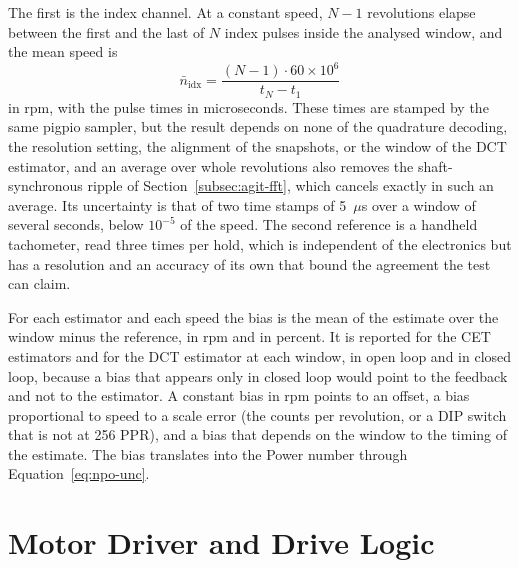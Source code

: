 The first is the index channel. At a constant speed, $N - 1$ revolutions elapse between the first and the last of $N$ index pulses inside the analysed window, and the mean speed is
\begin{equation}
    \bar{n}_{\mathrm{idx}} = \frac{(N-1)\cdot 60\times10^{6}}{t_N - t_1}
    \label{eq:idx-mean}
\end{equation}
in rpm, with the pulse times in microseconds. These times are stamped by the same pigpio sampler, but the result depends on none of the quadrature decoding, the resolution setting, the alignment of the snapshots, or the window of the DCT estimator, and an average over whole revolutions also removes the shaft-synchronous ripple of Section~\ref{subsec:agit-fft}, which cancels exactly in such an average. Its uncertainty is that of two time stamps of 5~$\mu$s over a window of several seconds, below $10^{-5}$ of the speed. The second reference is a handheld tachometer, read three times per hold, which is independent of the electronics but has a resolution and an accuracy of its own that bound the agreement the test can claim.

For each estimator and each speed the bias is the mean of the estimate over the window minus the reference, in rpm and in percent. It is reported for the CET estimators and for the DCT estimator at each window, in open loop and in closed loop, because a bias that appears only in closed loop would point to the feedback and not to the estimator. A constant bias in rpm points to an offset, a bias proportional to speed to a scale error (the counts per revolution, or a DIP switch that is not at 256 PPR), and a bias that depends on the window to the timing of the estimate. The bias translates into the Power number through Equation~\ref{eq:npo-unc}.



\section{Motor Driver and Drive Logic}
\label{sec:agit-drive}

